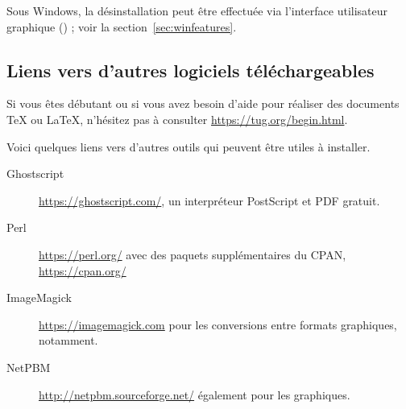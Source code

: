 \documentclass[german, english, french]{article}
\begin{document}
Sous Windows, la désinstallation peut être effectuée via l'interface utilisateur
graphique (\GUI) ; voir la section~\ref{sec:winfeatures}.

\subsection{Liens vers d'autres logiciels téléchargeables}

Si vous êtes débutant ou si vous avez besoin d'aide pour réaliser des documents
\TeX{} ou \LaTeX{}, n'hésitez pas à consulter \url{https://tug.org/begin.html}.


Voici quelques liens vers d'autres outils qui peuvent être utiles à installer.
\begin{description}
\item[Ghostscript] \url{https://ghostscript.com/}, un interpréteur PostScript et
  PDF gratuit.
\item[Perl] \url{https://perl.org/} avec des paquets supplémentaires du CPAN,
  \url{https://cpan.org/}
\item[ImageMagick] \url{https://imagemagick.com} pour les conversions entre
  formats graphiques, notamment.
\item[NetPBM] \url{http://netpbm.sourceforge.net/} également pour les
  graphiques.


\end{description}
\end{document}

